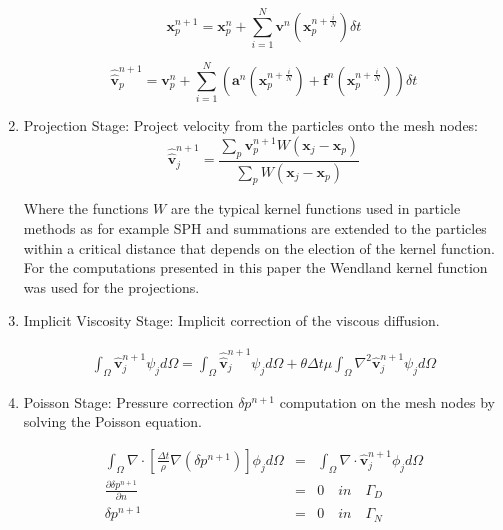 \begin{enumerate}
\begin{equation}\label{Step2astep}
\mathbf{x}^{n+1}_{p}=\mathbf{x}^{n}_{p} + \sum_{i=1}^{N} \mathbf{v}^{n}(\mathbf{x}^{n+\frac{i}{N}}_{p}) \delta t
\end{equation}

\begin{equation}\label{Step2bstep}
\widehat{\widehat{\mathbf{v}}}^{n+1}_{p}=\mathbf{v}^{n}_{p} + \sum_{i=1}^{N} \left(\mathbf{a}^{n}(\mathbf{x}^{n+\frac{i}{N}}_{p}) + \mathbf{f}^{n} (\mathbf{x}^{n+\frac{i}{N}}_{p})\right)  \delta t
\end{equation}

  \item Projection Stage: Project velocity from the particles onto the mesh nodes:
  \begin{equation}\label{Step3a}
\displaystyle \widehat{\widehat{\mathbf{v}}}^{n+1}_{j}=\frac{\sum_{p} \mathbf{v}^{n+1}_{p} W(\mathbf{x}_{j}-\mathbf{x}_{p})}{\sum_{p} W(\mathbf{x}_{j}-\mathbf{x}_{p})}
\end{equation}



Where the functions $W$ are the typical kernel functions used in particle methods as for example SPH \cite{Mon77} and summations are extended to the particles within a critical distance that depends on the election of the kernel function. For the computations presented in this paper the Wendland kernel function \cite{Wendland} was used for the projections.

  \item Implicit Viscosity Stage: Implicit correction of the viscous diffusion.

 \begin{eqnarray}\label{Step4a}
\displaystyle \int_{\Omega} \widehat{\mathbf{v}}^{n+1}_{j}\psi_j d\Omega =\int_{\Omega} \widehat{\widehat{\mathbf{v}}}^{n+1}_{j}\psi_j d\Omega + \theta \Delta t \mu \int_{\Omega} \nabla^{2}\widehat{\mathbf{v}}^{n+1}_{j} \psi_j d\Omega
\end{eqnarray}



 \item Poisson Stage: Pressure correction $\delta p^{n+1}$ computation on the mesh nodes by solving the Poisson equation.


 \begin{eqnarray}\label{Step5a}
   \int_{\Omega} \nabla \cdot [\frac{\Delta t}{\rho}\nabla(\delta p^{n+1})] \phi_j d\Omega &=& \int_{\Omega} \nabla \cdot \widehat{\mathbf{v}}_j^{n+1} \phi_j d\Omega \\
   \frac{\partial \delta p^{n+1}}{\partial n} &=& 0 \quad in \quad \Gamma_D \\
   \delta p^{n+1} &=& 0 \quad in \quad \Gamma_N
 \end{eqnarray}


\end{enumerate}
